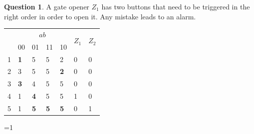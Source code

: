 \documentclass[11pt,a4paper,dvipsnames]{article}
\theoremstyle{definition}%
\newtheorem{Q}{Question}[] %
\newcommand{\reponse}[1]{%
	\ifthenelse {\boolean{corrige}} {\paragraph{Réponse :}
    \color{darkblue} #1 \color{black}} {}
 }
\newcounter{reponseCnt}
\begin{document}
\begin{Q}
	A gate opener $Z_1$ has two buttons that need to be triggered in the right order in order to open it.
	Any mistake leads to an alarm.

	\begin{center}
		\begin{tabular}{|l|l|l|l|l|l|l|} \hline
			\multirow{2}{*}{} & \multicolumn{4}{c|}{$ab$} & \multirow{2}{*}{$Z_1$} & \multirow{2}{*}{$Z_2$} \\ \cline{2-5}
			& 00 & 01 & 11 & 10 & & \\ \hline
			1 & \textbf{1} & 5 & 5 & 2 & 0 & 0 \\ \hline
			2 & 3 & 5 & 5 & \textbf{2} & 0 & 0 \\ \hline
			3 & \textbf{3} & 4 & 5 & 5 & 0 & 0 \\ \hline
			4 & 1 & \textbf{4} & 5 & 5 & 1 & 0 \\ \hline
			5 & 1 & \textbf{5} & \textbf{5} & \textbf{5} & 0 & 1 \\ \hline
		\end{tabular}
	\end{center}

\ifnum\value{reponseCnt}=1
  
\fi

\end{Q}


%


\end{document}
